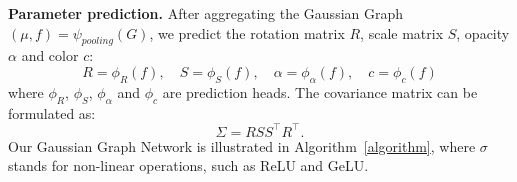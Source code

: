 \textbf{Parameter prediction.} After aggregating the Gaussian Graph $(\mu,f)=\psi_{pooling}(G)$, we predict the rotation matrix $R$, scale matrix $S$, opacity $\alpha$ and color $c$:
\begin{equation}
    R=\phi_{R}(f),\quad S=\phi_{S}(f),\quad \alpha=\phi_{\alpha}(f), \quad c=\phi_{c}(f)
\end{equation}
where $\phi_{R}$, $\phi_{S}$, $\phi_{\alpha}$ and $\phi_c$ are prediction heads. The covariance matrix can be formulated as:
\begin{equation}
    \Sigma=RSS^\top R^\top.
\end{equation}
 Our Gaussian Graph Network is illustrated in Algorithm~\ref{algorithm}, where $\sigma$ stands for non-linear operations, such as ReLU and GeLU.










 


